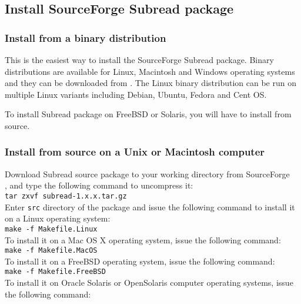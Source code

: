 \documentclass[12pt]{report}
\newcommand{\code}[1]{{\small\texttt{#1}}}
\newcommand{\Subread}{\textsf{Subread}}
\begin{document}
\subsection{Install SourceForge {\Subread} package}

\subsubsection{Install from a binary distribution}

This is the easiest way to install the SourceForge {\Subread} package.
Binary distributions are available for Linux, Macintosh and Windows operating systems and they can be downloaded from {}.
The Linux binary distribution can be run on multiple Linux variants including Debian, Ubuntu, Fedora and Cent OS.

To install {\Subread} package on FreeBSD or Solaris, you will have to install from source.

\subsubsection{Install from source on a Unix or Macintosh computer}

Download {\Subread} source package to your working directory from SourceForge \\
{}, and type the following command to uncompress it:\\

\code{tar zxvf subread-1.x.x.tar.gz}\\

Enter \code{src} directory of the package and issue the following command to install it on a Linux operating system: \\

\code{make -f Makefile.Linux}\\

To install it on a Mac OS X operating system, issue the following command:\\

\code{make -f Makefile.MacOS}\\

To install it on a FreeBSD operating system, issue the following command:\\

\code{make -f Makefile.FreeBSD}\\

To install it on Oracle Solaris or OpenSolaris computer operating systems, issue the following command:\\
\end{document}
